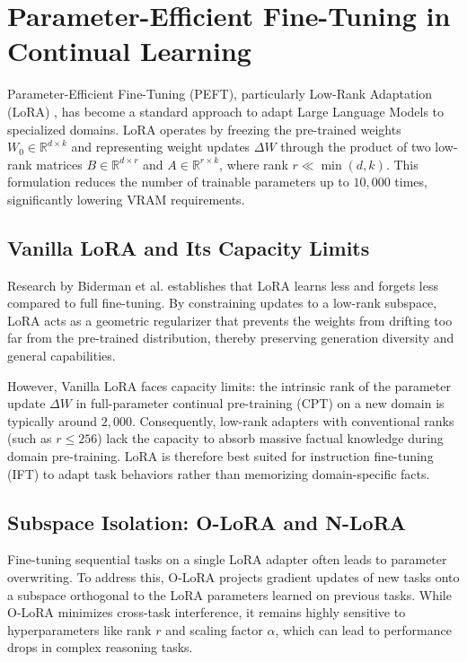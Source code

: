 \section{Parameter-Efficient Fine-Tuning in Continual Learning}
\label{sec:peft}

Parameter-Efficient Fine-Tuning (PEFT), particularly Low-Rank Adaptation (LoRA) \parencite{hu2021loralowrankadaptationlarge}, has become a standard approach to adapt Large Language Models to specialized domains. LoRA operates by freezing the pre-trained weights $W_0 \in \mathbb{R}^{d \times k}$ and representing weight updates $\Delta W$ through the product of two low-rank matrices $B \in \mathbb{R}^{d \times r}$ and $A \in \mathbb{R}^{r \times k}$, where rank $r \ll \min(d, k)$. This formulation reduces the number of trainable parameters up to $10,000$ times, significantly lowering VRAM requirements.

\subsection{Vanilla LoRA and Its Capacity Limits}
Research by Biderman et al. \parencite{biderman2024loralearnsforgets} establishes that LoRA learns less and forgets less compared to full fine-tuning. By constraining updates to a low-rank subspace, LoRA acts as a geometric regularizer that prevents the weights from drifting too far from the pre-trained distribution, thereby preserving generation diversity and general capabilities.

However, Vanilla LoRA faces capacity limits: the intrinsic rank of the parameter update $\Delta W$ in full-parameter continual pre-training (CPT) on a new domain is typically around $2,000$. Consequently, low-rank adapters with conventional ranks (such as $r \le 256$) lack the capacity to absorb massive factual knowledge during domain pre-training. LoRA is therefore best suited for instruction fine-tuning (IFT) to adapt task behaviors rather than memorizing domain-specific facts.

\subsection{Subspace Isolation: O-LoRA and N-LoRA}
Fine-tuning sequential tasks on a single LoRA adapter often leads to parameter overwriting. To address this, O-LoRA \parencite{wang-etal-2023-orthogonal, repec:axf:aidtaa:v:3:y:2026:i:1:p:52-61} projects gradient updates of new tasks onto a subspace orthogonal to the LoRA parameters learned on previous tasks. While O-LoRA minimizes cross-task interference, it remains highly sensitive to hyperparameters like rank $r$ and scaling factor $\alpha$, which can lead to performance drops in complex reasoning tasks.


